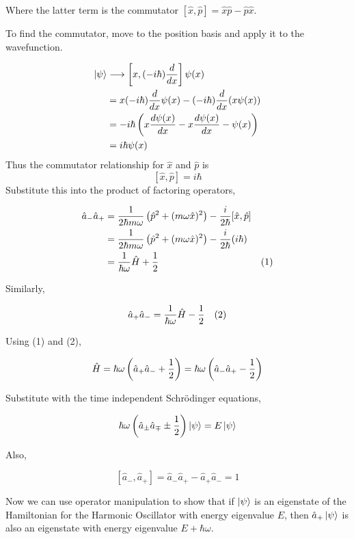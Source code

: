 \documentclass[english, 11pt]{article}
\begin{document}
      Where the latter term is the commutator $[\hat{x}, \hat{p}] = \hat{x}\hat{p}-\hat{p}\hat{x}$. \newline

      To find the commutator, move to the position basis and apply it to the wavefunction.

      \begin{align*}
         [\hat{x}, \hat{p}]\ket{\psi} & \longrightarrow \left[x, (-i\hbar)\f{d}{dx} \right]\psi(x)  \\
         & = x(-i\hbar)\f{d}{dx} \psi(x) - (-i\hbar)\f{d}{dx} (x\psi(x)) \\
         & = -i\hbar \left( x \f{d\psi(x)}{dx} - x\f{d\psi(x)}{dx} - \psi(x) \right) \\
         &  = i\hbar\psi(x)
       \end{align*}
       Thus the commutator relationship for $\hat{x}$ and $\hat{p}$ is
       \[ [\hat{x},\hat{p}] = i\hbar \]
       Substitute this into the product of factoring operators,

       \begin{align*}
         \hat{a}_-\hat{a}_+ & = \frac{1}{2\hbar m \omega} \left( \hat{p}^2 + (m\omega \hat{x})^2 \right) - \frac{i}{2\hbar}[\hat{x},\hat{p}] \\
         & = \frac{1}{2\hbar m \omega} \left( \hat{p}^2 + (m\omega\hat{x})^2 \right) - \frac{i}{2\hbar}(i\hbar) \\
         & = \frac{1}{\hbar \omega}\hat{H} + \frac{1}{2} & (1)
       \end{align*}

       Similarly,

       \begin{align*}
         \hat{a}_+\hat{a}_- &  = \frac{1}{\hbar\omega}\hat{H} - \frac{1}{2} & (2)
       \end{align*}

       Using (1) and (2),

       \[ \hat{H} = \hbar \omega \left(\hat{a}_+\hat{a}_- + \frac{1}{2}\right) = \hbar \omega \left(\hat{a}_-\hat{a}_+ - \frac{1}{2}\right) \]

       Substitute with the time independent Schrödinger equations,

       \[ \hbar\omega \left( \hat{a}_\pm\hat{a}_\mp  \pm \frac{1}{2} \right)\left|\psi\right\rangle = E\left|\psi\right\rangle \]

       Also,

       \[ [\hat{a}_-,\hat{a}_+] = \hat{a}_-\hat{a}_+ - \hat{a}_+\hat{a}_- = 1 \]

       Now we can use operator manipulation to show that if $\left|\psi\right\rangle$ is an eigenstate of the Hamiltonian for the Harmonic Oscillator with energy eigenvalue $E$, then $\hat{a}_+\left|\psi\right\rangle$ is also an eigenstate with energy eigenvalue $E + \hbar \omega$.
\end{document}
